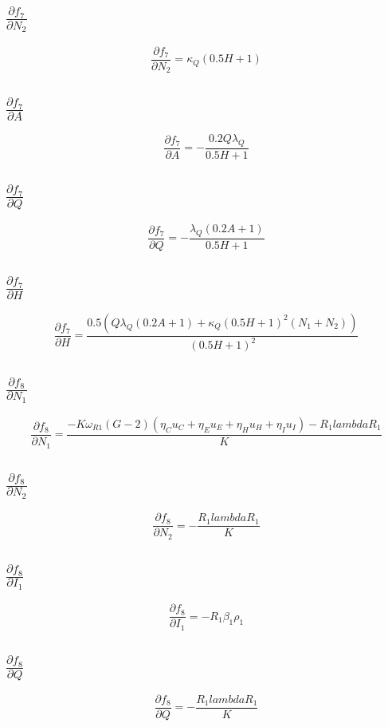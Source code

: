 \documentclass{article}
\begin{document}
\subsection{$\frac{\partial f_{7}}{\partial N_2}$}
\[
\frac{\partial f_{7}}{\partial N_2} = \kappa_{Q} \left(0.5 H + 1\right)
\]

\subsection{$\frac{\partial f_{7}}{\partial A}$}
\[
\frac{\partial f_{7}}{\partial A} = - \frac{0.2 Q \lambda_{Q}}{0.5 H + 1}
\]

\subsection{$\frac{\partial f_{7}}{\partial Q}$}
\[
\frac{\partial f_{7}}{\partial Q} = - \frac{\lambda_{Q} \left(0.2 A + 1\right)}{0.5 H + 1}
\]

\subsection{$\frac{\partial f_{7}}{\partial H}$}
\[
\frac{\partial f_{7}}{\partial H} = \frac{0.5 \left(Q \lambda_{Q} \left(0.2 A + 1\right) + \kappa_{Q} \left(0.5 H + 1\right)^{2} \left(N_{1} + N_{2}\right)\right)}{\left(0.5 H + 1\right)^{2}}
\]

\subsection{$\frac{\partial f_{8}}{\partial N_1}$}
\[
\frac{\partial f_{8}}{\partial N_1} = \frac{- K \omega_{R1} \left(G - 2\right) \left(\eta_{C} u_{C} + \eta_{E} u_{E} + \eta_{H} u_{H} + \eta_{I} u_{I}\right) - R_{1} lambdaR_{1}}{K}
\]

\subsection{$\frac{\partial f_{8}}{\partial N_2}$}
\[
\frac{\partial f_{8}}{\partial N_2} = - \frac{R_{1} lambdaR_{1}}{K}
\]

\subsection{$\frac{\partial f_{8}}{\partial I_1}$}
\[
\frac{\partial f_{8}}{\partial I_1} = - R_{1} \beta_{1} \rho_{1}
\]

\subsection{$\frac{\partial f_{8}}{\partial Q}$}
\[
\frac{\partial f_{8}}{\partial Q} = - \frac{R_{1} lambdaR_{1}}{K}
\]
\end{document}
